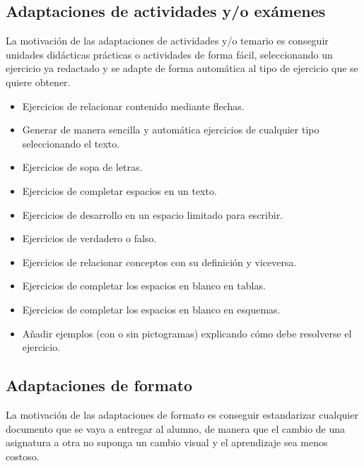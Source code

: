 \subsection{Adaptaciones de actividades y/o ex\'amenes}

La motivaci\'on de las adaptaciones de actividades y/o temario es conseguir unidades did\'acticas pr\'acticas o actividades de forma f\'acil, seleccionando un ejercicio ya redactado y se adapte de forma autom\'atica al tipo de ejercicio que se quiere obtener.

\begin{itemize}
	\item Ejercicios de relacionar contenido mediante flechas.
    \item Generar de manera sencilla y autom\'atica ejercicios de cualquier tipo seleccionando el texto.
    \item Ejercicios de sopa de letras.
    \item Ejercicios de completar espacios en un texto.
    \item Ejercicios de desarrollo en un espacio limitado para escribir.
    \item Ejercicios de verdadero o falso.
    \item Ejercicios de relacionar conceptos con su definici\'on y viceversa.
    \item Ejercicios de completar los espacios en blanco en tablas.
    \item Ejercicios de completar los espacios en blanco en esquemas.
    \item A\~{n}adir ejemplos (con o sin pictogramas) explicando c\'omo debe resolverse el ejercicio.
\end{itemize}

\subsection{Adaptaciones de formato}

La motivaci\'on de las adaptaciones de formato es conseguir estandarizar cualquier documento que se vaya a entregar al alumno, de manera que el cambio de una asignatura a otra no suponga un cambio visual y el aprendizaje sea menos costoso.

